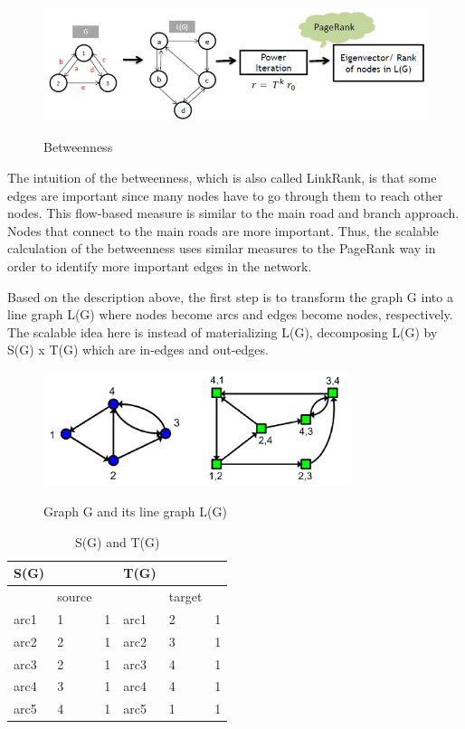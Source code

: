 \begin{figure}[h]
	\begin{center}
		\label{fig5}		
		\includegraphics[width=1.0\textwidth]{fig5}	
		\caption{Betweenness}	
	\end{center}
\end{figure}

The intuition of the betweenness, which is also called LinkRank, is that some edges are important since many nodes have to go through them to reach other nodes. This flow-based measure is similar to the main road and branch approach. Nodes that connect to the main roads are more important. Thus, the scalable calculation of the betweenness uses similar measures to the PageRank way in order to identify more important edges in the network.

Based on the description above, the first step is to transform the graph G into a line graph L(G) where nodes become arcs and edges become nodes, respectively. The scalable idea here is instead of materializing L(G), decomposing L(G) by S(G) x T(G) which are in-edges and out-edges. 

\begin{figure}[h]
	\begin{center}
		\label{fig6}		
		\includegraphics[width=0.8\textwidth]{fig6}	
		\caption{Graph G and its line graph L(G)}	
	\end{center}
\end{figure}

\begin{table}[t]
	\caption{S(G) and T(G)}
	\label{t1}
	\begin{center}
		\begin{tabular}{|l|l|l|l|l|l|}
			\hline
			S(G)	&	&	&T(G)	&	&	\\ \hline
				&source	&	&	&target	&	\\	\hline
			arc1	&1	&1	&arc1	&2	&1	\\ \hline
			arc2	&2	&1	&arc2	&3	&1	\\ \hline
			arc3	&2	&1	&arc3	&4	&1	\\ \hline
			arc4	&3	&1	&arc4	&4	&1	\\ \hline
			arc5	&4	&1	&arc5	&1	&1	\\ \hline
		\end{tabular}
	\end{center}
\end{table}

